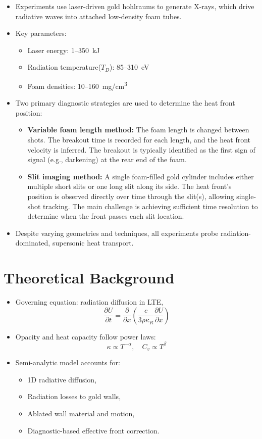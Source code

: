 \documentclass{article}
\begin{document}
\begin{itemize}
    \item Experiments use laser-driven gold hohlraums to generate X-rays, which drive radiative waves into attached low-density foam tubes.
    \item Key parameters:
    \begin{itemize}
        \item Laser energy: 1–350~kJ
        \item Radiation temperature($T_D$): 85–310~eV
        \item Foam densities: 10–160~mg/cm\textsuperscript{3}
    \end{itemize}
    \item Two primary diagnostic strategies are used to determine the heat front position:
    \begin{itemize}
        \item \textbf{Variable foam length method:} The foam length is changed between shots. The breakout time is recorded for each length, and the heat front velocity is inferred. The breakout is typically identified as the first sign of signal (e.g., darkening) at the rear end of the foam.
        \item \textbf{Slit imaging method:} A single foam-filled gold cylinder includes either multiple short slits or one long slit along its side. The heat front's position is observed directly over time through the slit(s), allowing single-shot tracking. The main challenge is achieving sufficient time resolution to determine when the front passes each slit location.
    \end{itemize}
    \item Despite varying geometries and techniques, all experiments probe radiation-dominated, supersonic heat transport.
\end{itemize}

\section{Theoretical Background}

\begin{itemize}
    \item Governing equation: radiation diffusion in LTE,
    \[
    \frac{\partial U}{\partial t} = \frac{\partial}{\partial x} \left( \frac{c}{3\rho \kappa_R} \frac{\partial U}{\partial x} \right)
    \]
    \item Opacity and heat capacity follow power laws:
    \[
    \kappa \propto T^{-\alpha}, \quad C_v \propto T^\beta
    \]
    \item Semi-analytic model accounts for:
    \begin{itemize}
        \item 1D radiative diffusion,
        \item Radiation losses to gold walls,
        \item Ablated wall material and motion,
        \item Diagnostic-based effective front correction.
    \end{itemize}
\end{itemize}
\end{document}
